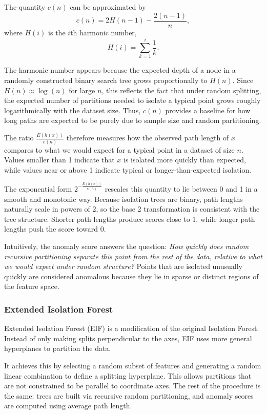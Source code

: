 The quantity $c(n)$ can be approximated by
\[
c(n) = 2H(n-1) - \frac{2(n-1)}{n},
\]
where $H(i)$ is the $i$th harmonic number,
\[
H(i) = \sum_{k=1}^{i} \frac{1}{k}.
\]

The harmonic number appears because the expected depth of a node in a randomly constructed binary search tree grows proportionally to $H(n)$. 
Since $H(n) \approx \log(n)$ for large $n$, this reflects the fact that under random splitting, the expected number of partitions needed to isolate a typical point grows roughly logarithmically with the dataset size. 
Thus, $c(n)$ provides a baseline for how long paths are expected to be purely due to sample size and random partitioning.

The ratio $\frac{E(h(x))}{c(n)}$ therefore measures how the observed path length of $x$ compares to what we would expect for a typical point in a dataset of size $n$. 
Values smaller than 1 indicate that $x$ is isolated more quickly than expected, while values near or above 1 indicate typical or longer-than-expected isolation.

The exponential form $2^{-\frac{E(h(x))}{c(n)}}$ rescales this quantity to lie between 0 and 1 in a smooth and monotonic way. 
Because isolation trees are binary, path lengths naturally scale in powers of 2, so the base 2 transformation is consistent with the tree structure. 
Shorter path lengths produce scores close to 1, while longer path lengths push the score toward 0.

Intuitively, the anomaly score answers the question: 
\emph{How quickly does random recursive partitioning separate this point from the rest of the data, relative to what we would expect under random structure?} 
Points that are isolated unusually quickly are considered anomalous because they lie in sparse or distinct regions of the feature space.

\bigskip

\subsubsection{Extended Isolation Forest}

\medskip

Extended Isolation Forest (EIF) is a modification of the original Isolation Forest. Instead of only making splits perpendicular to the axes, EIF uses more general hyperplanes to partition the data.

It achieves this by selecting a random subset of features and generating a random linear combination to define a splitting hyperplane. This allows partitions that are not constrained to be parallel to coordinate axes. The rest of the procedure is the same: trees are built via recursive random partitioning, and anomaly scores are computed using average path length. 

